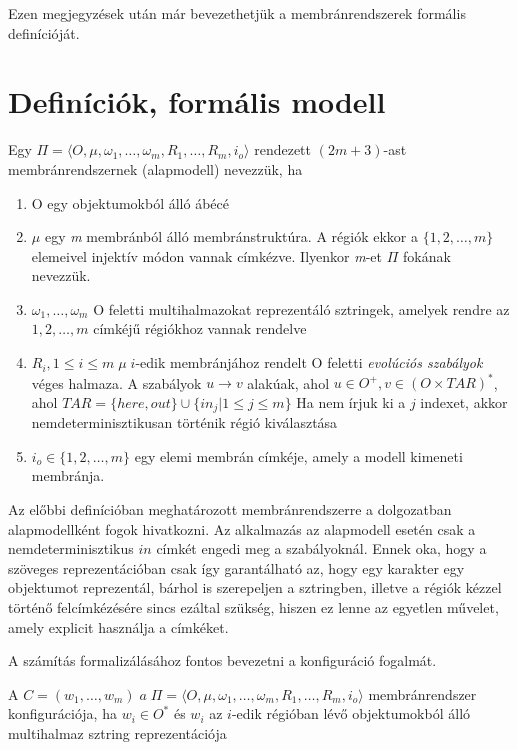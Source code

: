 Ezen megjegyzések után már bevezethetjük a membránrendszerek formális definícióját.

\section{Definíciók, formális modell}

\begin{definition}
Egy $\Pi = \langle O, \mu , \omega_1 , \dots , \omega_m, R_1 , \dots , R_m , i_o  \rangle$ rendezett $(2m + 3)$-ast membránrendszernek (alapmodell) nevezzük, ha

\begin{enumerate}
\item O egy objektumokból álló ábécé
\item $\mu$ egy \textit{m} membránból álló membránstruktúra. A régiók ekkor a $\{1,2, \dots, m\}$ elemeivel injektív módon vannak címkézve. Ilyenkor \textit{m}-et $\Pi$ fokának nevezzük.

\item  $\omega_1 , \dots , \omega_m$ O feletti multihalmazokat reprezentáló sztringek, amelyek rendre az $1, 2, \dots, m$ címkéjű régiókhoz vannak rendelve

\item $R_i, 1 \leq i \leq m \; \mu \; i$-edik membránjához rendelt O feletti \textit{evolúciós szabályok} véges halmaza. A szabályok $u \rightarrow v$ alakúak, ahol $u \in O^+, v \in (O \times TAR)^*$, ahol $TAR=\{here, out\} \cup \{ in_j | 1  \leq j \leq m \} $ Ha nem írjuk ki a $j$ indexet, akkor nemdeterminisztikusan történik régió kiválasztása

\item$ i_o \in \{1,2, \dots, m\}$ egy elemi membrán címkéje, amely a modell kimeneti membránja.
\end{enumerate}
\end{definition}

Az előbbi definícióban meghatározott membránrendszerre a dolgozatban alapmodellként fogok hivatkozni. Az alkalmazás az alapmodell esetén csak a nemdeterminisztikus $in$ címkét engedi meg a szabályoknál. Ennek oka, hogy a szöveges reprezentációban csak így garantálható az, hogy egy karakter egy objektumot reprezentál, bárhol is szerepeljen a sztringben, illetve a régiók kézzel történő felcímkézésére sincs ezáltal szükség, hiszen ez lenne az egyetlen művelet, amely explicit használja a címkéket. 

A számítás formalizálásához fontos bevezetni a konfiguráció fogalmát.
\begin{definition}\label{def:mem_sysm}
A $C = (w_1, \dots, w_m)  \; a  \; \Pi = \langle O, \mu , \omega_1 , \dots , \omega_m, R_1 , \dots , R_m , i_o  \rangle$ membránrendszer konfigurációja, ha $w_i \in O^*$ és $w_i$ az $i$-edik régióban lévő objektumokból álló multihalmaz sztring reprezentációja
\end{definition}

